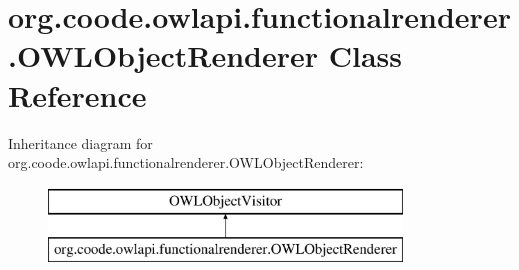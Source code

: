 \hypertarget{classorg_1_1coode_1_1owlapi_1_1functionalrenderer_1_1_o_w_l_object_renderer}{\section{org.\-coode.\-owlapi.\-functionalrenderer.\-O\-W\-L\-Object\-Renderer Class Reference}
\label{classorg_1_1coode_1_1owlapi_1_1functionalrenderer_1_1_o_w_l_object_renderer}
}
Inheritance diagram for org.\-coode.\-owlapi.\-functionalrenderer.\-O\-W\-L\-Object\-Renderer\-:\begin{figure}[H]
\begin{center}
\leavevmode
\includegraphics[height=2.000000cm]{classorg_1_1coode_1_1owlapi_1_1functionalrenderer_1_1_o_w_l_object_renderer}
\end{center}
\end{figure}
